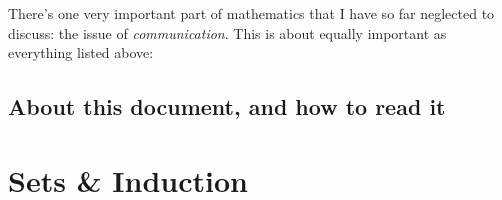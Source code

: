\documentclass[10pt]{article}
\theoremstyle{definition}
\begin{document}
There's one very important part of mathematics that I have so far neglected to discuss: the issue of \emph{communication}.  This is about equally important as everything listed above: 

\subsection{About this document, and how to read it}
\clearpage
\section{Sets \& Induction}
\end{document}
